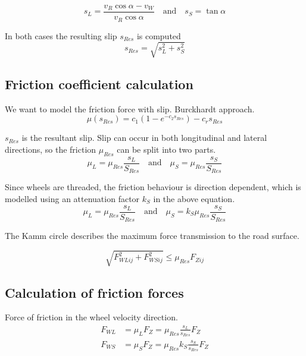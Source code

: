 \begin{equation}
  s_L = \frac{v_R \cos{\alpha} - v_W}{v_R \cos{\alpha}}
  \quad \text{and} \quad
  s_S = \tan{\alpha}
\end{equation}

In both cases the resulting slip $s_{Res}$ is computed 
\begin{equation}
  s_{Res} = \sqrt{s_L^2 + s_S^2}
\end{equation}


\subsection{Friction coefficient calculation}

We want to model the friction force with slip. 
Burckhardt approach.
\begin{equation}
    \mu(s_{Res}) = c_1 \left( 1 - e^{-c_2 s_{Res}} \right) - c_r s_{Res}
\end{equation}

$s_{Res}$ is the resultant slip. Slip can occur in both longitudinal and lateral directions, so the friction $\mu_{Res}$ can be split into two parts.
\begin{equation}
  \mu_L = \mu_{Res}\frac{s_L}{S_{Res}} 
  \quad \text{and} \quad
  \mu_S = \mu_{Res}\frac{s_S}{S_{Res}} 
\end{equation}

Since wheels are threaded, the friction behaviour is direction dependent, which is modelled using an attenuation factor $k_S$ in the above equation.
\begin{equation}
  \mu_L = \mu_{Res}\frac{s_L}{S_{Res}} 
  \quad \text{and} \quad
  \mu_S = k_S \mu_{Res} \frac{s_S}{S_{Res}} 
\end{equation}

The Kamm circle describes the maximum force transmission to the road surface.

\begin{equation}
  \sqrt{F_{WLij}^2 + F_{WSij}^2} \leq \mu_{Res} F_{Zij}
\end{equation}


\subsection{Calculation of friction forces}

Force of friction in the wheel velocity direction.
\begin{align*}
  F_{WL} &= \mu_L F_Z = \mu_{Res} \frac{s_L}{s_{Res}} F_Z \\ 
  F_{WS} &= \mu_S F_Z = \mu_{Res} k_S \frac{s_S}{s_{Res}} F_Z
\end{align*}


